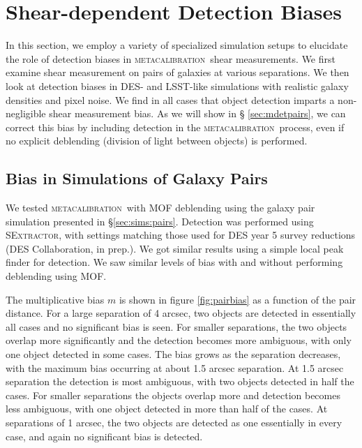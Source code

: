 \documentclass[fleqn,useAMS,usenatbib]{mnras}
\newcommand{\mcal}{\textsc{metacalibration}}
\newcommand{\sx}{\textsc{SExtractor}}
\begin{document}
\section{Shear-dependent Detection Biases}\label{sec:detbiases}

In this section, we employ a variety of specialized simulation setups to
elucidate the role of detection biases in \mcal\ shear measurements. We first
examine shear measurement on pairs of galaxies at various separations. We then
look at detection biases in DES- and LSST-like simulations with realistic
galaxy densities and pixel noise. We find in all cases that object detection
imparts a non-negligible shear measurement bias. As we will show in \S
\ref{sec:mdetpairs}, we can correct this bias by including detection in the
\mcal\ process, even if no explicit deblending (division of light between
objects) is performed.

\subsection{Bias in Simulations of Galaxy Pairs}

We tested \mcal\ with MOF deblending using the galaxy pair simulation presented
in \S \ref{sec:sims:pairs}. Detection was performed using \sx, with settings
matching those used for DES year 5 survey reductions (DES Collaboration, in prep.).
We got similar results using a simple local peak finder for detection.
We saw similar levels of bias with and without performing deblending using MOF.

The multiplicative bias $m$ is shown in figure \ref{fig:pairbias} as a function
of the pair distance. For a large separation of 4 arcsec, two objects are
detected in essentially all cases and no significant bias is seen.  For smaller
separations, the two objects overlap more significantly and the detection
becomes more ambiguous, with only one object detected in some cases.  The bias
grows as the separation decreases, with the maximum bias occurring at about 1.5
arcsec separation. At 1.5 arcsec separation the detection is most ambiguous,
with two objects detected in half the cases. For smaller separations the
objects overlap more and detection becomes less ambiguous, with one object
detected in more than half of the cases. At separations of 1 arcsec, the two
objects are detected as one essentially in every case, and again no significant
bias is detected.
\end{document}
